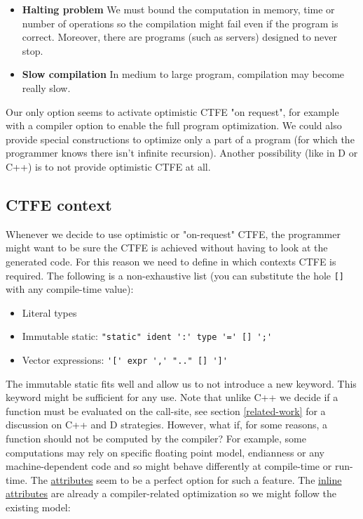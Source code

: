 \documentclass[a4paper,11pt]{article}
\begin{document}
\begin{itemize}
\item \textbf{Halting problem} We must bound the computation in memory, time or number of operations so the compilation might fail even if the program is correct. Moreover, there are programs (such as servers) designed to never stop.
\item \textbf{Slow compilation} In medium to large program, compilation may become really slow.
\end{itemize}

Our only option seems to activate optimistic CTFE "on request", for example with a compiler option to enable the full program optimization. We could also provide special constructions to optimize only a part of a program (for which the programmer knows there isn't infinite recursion). Another possibility (like in D or C++) is to not provide optimistic CTFE at all.

\subsection{CTFE context}
\label{ctfe-context}

Whenever we decide to use optimistic or "on-request" CTFE, the programmer might want to be sure the CTFE is achieved without having to look at the generated code. For this reason we need to define in which contexts CTFE is required. The following is a non-exhaustive list (you can substitute the hole \lstinline{[]} with any compile-time value):

\begin{itemize}
\item Literal types
\item Immutable static: \lstinline[mathescape]{"static" ident ':' type '=' [] ';'}
\item Vector expressions: \lstinline[mathescape]{'[' expr ',' ".." [] ']'}
\end{itemize}

The immutable static fits well and allow us to not introduce a new keyword. This keyword might be sufficient for any use. Note that unlike C++ we decide if a function must be evaluated on the call-site, see section \ref{related-work} for a discussion on C++ and D strategies. However, what if, for some reasons, a function should not be computed by the compiler? For example, some computations may rely on specific floating point model, endianness or any machine-dependent code and so might behave differently at compile-time or run-time. The \href{http://static.rust-lang.org/doc/master/rust.html#attributes}{attributes} seem to be a perfect option for such a feature. The \href{http://static.rust-lang.org/doc/master/rust.html#inline-attributes}{inline attributes} are already a compiler-related optimization so we might follow the existing model:
\end{document}
